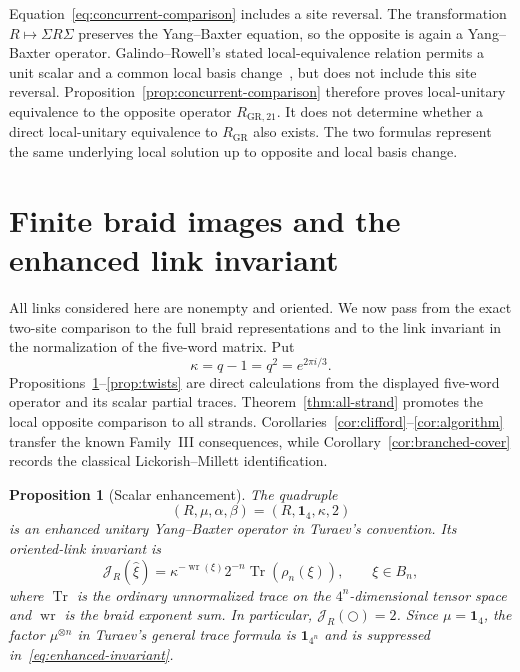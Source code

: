 \documentclass[11pt]{article}
\newtheorem{proposition}[theorem]{Proposition}
\theoremstyle{remark}
\newcommand{\Id}{\mathbf 1}
\newcommand{\Tr}{\operatorname{Tr}}
\begin{document}
Equation~\eqref{eq:concurrent-comparison} includes a site reversal.  The
transformation \(R\mapsto\Sigma R\Sigma\) preserves the Yang--Baxter equation,
so the opposite is again a Yang--Baxter operator.  Galindo--Rowell's stated
local-equivalence relation permits a unit scalar and a common local basis
change~\cite[\S2]{GalindoRowell2026}, but does not include this site reversal.
Proposition~\ref{prop:concurrent-comparison} therefore proves local-unitary
equivalence to the opposite operator \(R_{\mathrm{GR},21}\).  It does not
determine whether a direct local-unitary equivalence to \(R_{\mathrm{GR}}\)
also exists.  The two formulas represent the same underlying local solution up
to opposite and local basis change.

\section{Finite braid images and the enhanced link invariant}
\label{sec:global}

All links considered here are nonempty and oriented.
We now pass from the exact two-site comparison to the full braid
representations and to the link invariant in the normalization of the
five-word matrix.  Put
\[
  \kappa=q-1=q^2=e^{2\pi i/3}.
\]
Propositions~\ref{prop:enhancement}--\ref{prop:twists} are direct calculations
from the displayed five-word operator and its scalar partial traces.
Theorem~\ref{thm:all-strand} promotes the local opposite comparison to all
strands.  Corollaries~\ref{cor:clifford}--\ref{cor:algorithm} transfer the known
Family~III consequences, while Corollary~\ref{cor:branched-cover} records the
classical Lickorish--Millett identification.

\begin{proposition}[Scalar enhancement]\label{prop:enhancement}
The quadruple
\[
  (R,\mu,\alpha,\beta)=(R,\Id_4,\kappa,2)
\]
is an enhanced unitary Yang--Baxter operator in Turaev's convention.  Its
oriented-link invariant is
\begin{equation}
  \mathcal J_R(\widehat\xi)
  =\kappa^{-\operatorname{wr}(\xi)}2^{-n}
   \Tr(\rho_n(\xi)),
  \qquad \xi\in B_n,
  \label{eq:enhanced-invariant}
\end{equation}
where \(\Tr\) is the ordinary unnormalized trace on the \(4^n\)-dimensional
tensor space and \(\operatorname{wr}\) is the braid exponent sum.  In
particular, \(\mathcal J_R(\bigcirc)=2\).  Since \(\mu=\Id_4\), the factor
\(\mu^{\otimes n}\) in Turaev's general trace formula is \(\Id_{4^n}\) and is
suppressed in~\eqref{eq:enhanced-invariant}.
\end{proposition}
\end{document}
